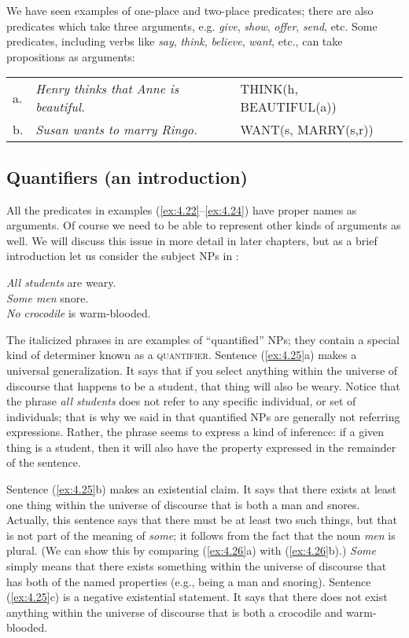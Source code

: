 We have seen examples of one-place and two-place predicates; there are also predicates which take three arguments, e.g. \textit{give}, \textit{show}, \textit{offer}, \textit{send}, etc. Some predicates, including verbs like \textit{say}, \textit{think}, \textit{believe}, \textit{want}, etc., can take propositions as arguments:


\ea \label{ex:4.24}
\begin{tabular}[t]{lll}
a. & \textit{Henry thinks that Anne is beautiful.}  & THINK(h, BEAUTIFUL(a))\\
b. & \textit{Susan wants to marry Ringo.} & WANT(s, MARRY(s,r))
\end{tabular}
\z

\subsection{Quantifiers (an introduction)}\label{sec:} %

All the predicates in examples (\ref{ex:4.22}--\ref{ex:4.24}) have proper names as arguments. Of course we need to be able to represent other kinds of arguments as well. We will discuss this issue in more detail in later chapters, but as a brief introduction let us consider the subject NPs in :


\ea \label{ex:4.25}
\ea \textit{All students} are weary.\\
\ex \textit{Some men} snore.\\
\ex \textit{No crocodile} is warm-blooded.
                       \z
\z

The italicized phrases in  are examples of “quantified” NPs; they contain a special kind of determiner known as a \textsc{quantifier}. Sentence (\ref{ex:4.25}a) makes a universal generalization. It says that if you select anything within the universe of discourse that happens to be a student, that thing will also be weary. Notice that the phrase \textit{all students} does not refer to any specific individual, or set of individuals; that is why we said in  that quantified NPs are generally not referring expressions. Rather, the phrase seems to express a kind of inference: if a given thing is a student, then it will also have the property expressed in the remainder of the sentence.


Sentence (\ref{ex:4.25}b) makes an existential claim. It says that there exists at least one thing within the universe of discourse that is both a man and snores. Actually, this sentence says that there must be at least two such things, but that is not part of the meaning of \textit{some}; it follows from the fact that the noun \textit{men} is plural. (We can show this by comparing (\ref{ex:4.26}a) with (\ref{ex:4.26}b).) \textit{Some} simply means that there exists something within the universe of discourse that has both of the named properties (e.g., being a man and snoring). Sentence (\ref{ex:4.25}c) is a negative existential statement. It says that there does not exist anything within the universe of discourse that is both a crocodile and warm-blooded.


